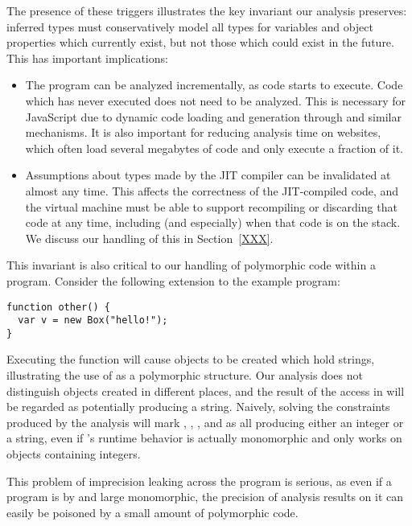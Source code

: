 The presence of these triggers illustrates the key invariant our analysis
preserves: inferred types must conservatively model all types for
variables and object properties which currently exist, but not those
which could exist in the future.
This has important implications:

\begin{itemize}

\item The program can be analyzed incrementally, as code starts to execute.
Code which has never executed does not need to be analyzed.
This is necessary for JavaScript due to dynamic code loading
and generation through
 and similar mechanisms. It is also important for reducing
analysis time on websites, which often load several megabytes of
code and only execute a fraction of it.

\item Assumptions about types made by the JIT compiler can be invalidated
at almost any time.
This affects the correctness of the JIT-compiled code, and the virtual machine
must be able to support recompiling or discarding that code at any time,
including (and especially) when that code is on the stack.
We discuss our handling of this in Section~\ref{XXX}.

\end{itemize}

This invariant is also critical to our handling of polymorphic code
within a program.
Consider the following extension to the example program:

\begin{lstlisting}[numbers=none]
function other() {
  var v = new Box("hello!");
}
\end{lstlisting}

Executing the  function will cause  objects
to be created which hold strings,
illustrating the use of  as a polymorphic structure.
Our analysis does not distinguish  objects created in different
places, and the result of the  access in  will
be regarded as potentially producing a string.
Naively, solving the constraints produced by the analysis will mark
, , , and  as all producing
either an integer or a string, even if 's runtime behavior is actually monomorphic
and only works on  objects containing integers.

This problem of imprecision leaking across the program is serious, as even
if a program is by and large monomorphic, the precision of analysis results on
it can easily be poisoned by a small amount of polymorphic code.

